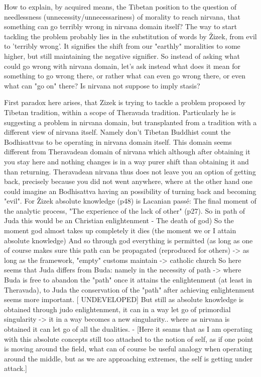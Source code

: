 \documentclass[10pt]{book}
\begin{document}
How to explain, by acquired means, the Tibetan position to the question of needlessness (unnecessity/unnecessariness) of morality to reach nirvana, that something can go terribly wrong in nirvana domain itself?
The way to start tackling the problem probably lies in the substitution of words by \v Zizek, from evil to 'terribly wrong'. It signifies the shift from our "earthly" moralities to some higher, but still maintaining the negative signifier. So instead of asking what could go wrong with nirvana domain, let's ask instead what does it mean for something to go wrong there, or rather what can even go wrong there, or even what can "go on" there? Is nirvana not suppose to imply stasis?

First paradox here arises, that Zizek is trying to tackle a problem proposed by Tibetan tradition, within a scope of Theravada tradition. Particularly he is suggesting a problem in nirvana domain, but transplanted from a tradition with a different view of nirvana itself. Namely don't Tibetan Buddhist count the Bodhisattvas to be operating in nirvana domain itself. This domain seems different from Theravadean domain of nirvana which although after obtaining it you stay here and nothing changes is in a way purer shift than obtaining it and than returning. Theravadean nirvana thus does not leave you an option of getting back, precisely because you did not went anywhere, where at the other hand one could imagine an Bodhisattva having an possibility of turning back and becoming "evil".
For \v Zizek absolute knowledge (p48) is Lacanian pass\'e: 
The final moment of the analytic process, "The experience of the lack of other" (p27). So in path of Juda this would be an Christian enlightenment - The death of god) So the moment god almost takes up completely it dies (the moment we or I attain absolute knowledge) And so through god everything is permitted (as long as one of course makes sure this path can be propagated (reproduced for others) -> as long as the framework, "empty" customs maintain -> catholic church 
So here seems that Juda differs from Buda: namely in the necessity of path -> where Buda is free to abandon the "path" once it attains the enlightenment (at least in Theravada), to Juda the conservation of the "path" after achieving enlightenment seems more important. [ UNDEVELOPED] But still as absolute knowledge is obtained through judo enlightenment, it can in a way let go of primordial singularity -> it in a way becomes a new singularity.. where as nirvana is obtained it can let go of all the dualities. - [Here it seams that as I am operating with this absolute concepts still too attached to the notion of self, as if one point is moving around the field, what can of course be useful analogy when operating around the middle, but as we are approaching extremes, the self is getting under attack.]
\end{document}
